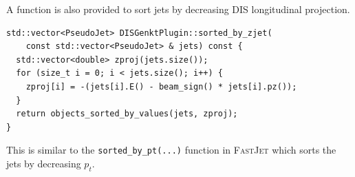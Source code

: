 A function is also provided to sort jets by decreasing DIS longitudinal projection.
\begin{lstlisting}[caption={Sorting jets by DIS longitudinal projection.}]
std::vector<PseudoJet> DISGenktPlugin::sorted_by_zjet(
    const std::vector<PseudoJet> & jets) const {
  std::vector<double> zproj(jets.size());
  for (size_t i = 0; i < jets.size(); i++) {
    zproj[i] = -(jets[i].E() - beam_sign() * jets[i].pz());
  }
  return objects_sorted_by_values(jets, zproj);
}
\end{lstlisting}
This is similar to the \texttt{sorted\_by\_pt(...)} function in \textsc{FastJet}
which sorts the jets by decreasing $p_t$.


